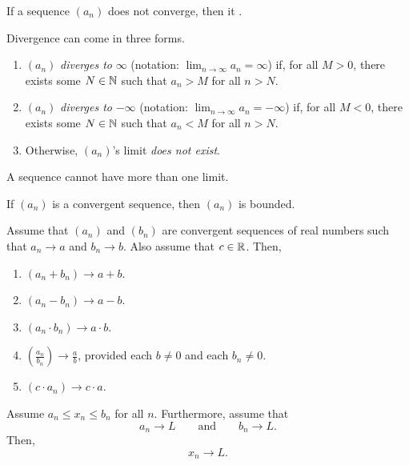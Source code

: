 \documentclass[11pt,twoside=off,numbers=noenddot]{scrbook}
\begin{document}
\begin{definition}
    If a sequence $(a_n)$ does not converge, then it .

    Divergence can come in three forms.
    \begin{enumerate}
        \item $(a_n)$ \textit{diverges to} $\infty$ (notation: $\lim_{n \to \infty} a_n = \infty$) if, for all $M > 0$, there exists some $N \in \mathbb N$ such that $a_n > M$ for all $n > N$.
        \item $(a_n)$ \textit{diverges to} $-\infty$ (notation: $\lim_{n \to \infty} a_n = -\infty$) if, for all $M < 0$, there exists some $N \in \mathbb N$ such that $a_n < M$ for all $n > N$.
        \item Otherwise, $(a_n)$'s limit \textit{does not exist}.
    \end{enumerate}
\end{definition}

\begin{proposition}
    A sequence cannot have more than one limit.
\end{proposition}

\begin{proposition}
    If $(a_n)$ is a convergent sequence, then $(a_n)$ is bounded.
\end{proposition}

\begin{theorem}
    Assume that $(a_n)$ and $(b_n)$ are convergent sequences of real numbers such that $a_n \to a$ and $b_n \to b$. Also assume that $c \in \mathbb R$. Then,
    \begin{enumerate}
        \item $(a_n + b_n) \to a + b$.
        \item $(a_n - b_n) \to a - b$.
        \item $(a_n \cdot b_n) \to a \cdot b$.
        \item $(\frac{a_n}{b_n}) \to \frac{a}{b}$, provided each $b \neq 0$ and each $b_n \neq 0$.
        \item $(c \cdot a_n) \to c \cdot a$.
    \end{enumerate}
\end{theorem}

\begin{theorem}
    Assume $a_n \leq x_n \leq b_n$ for all $n$. Furthermore, assume that
    \[ a_n \to L \qquad \text{and} \qquad b_n \to L. \]
    Then,
    \[ x_n \to L. \]
\end{theorem}
\end{document}
